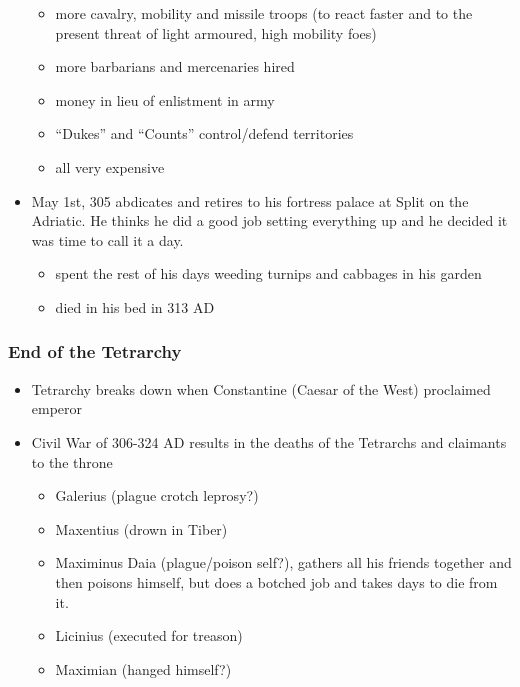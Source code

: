 \documentclass[12pt, twoside]{article}
\begin{document}
\begin{itemize}
\begin{itemize}
	\item more cavalry, mobility and missile troops (to react faster and to the present threat of light armoured, high mobility foes)
	\item more barbarians and mercenaries hired 
	\item money in lieu of enlistment in army
	\item “Dukes” and “Counts” control/defend territories
	\item all very expensive	
	\end{itemize}
\item May 1st, 305 abdicates and retires to his fortress palace at Split on the Adriatic.  He thinks he did a good job setting everything up and he decided it was time to call it a day.
	\begin{itemize}
	\item spent the rest of his days weeding turnips and cabbages in his garden
	\item died in his bed in 313 AD
	\end{itemize}
\end{itemize}

\subsubsection{End of the Tetrarchy}
\begin{itemize}
\item Tetrarchy breaks down when Constantine (Caesar of the West) proclaimed emperor
\item Civil War of 306-324 AD results in the deaths of the Tetrarchs and claimants to the throne 
	\begin{itemize}
	\item Galerius (plague crotch leprosy?)
	\item Maxentius (drown  in Tiber)
	\item Maximinus Daia (plague/poison self?), gathers all his friends together and then poisons himself, but does a botched job and takes days to die from it.
	\item Licinius (executed for treason)
	\item Maximian (hanged himself?)
	\end{itemize}
\end{itemize}
\end{document}
